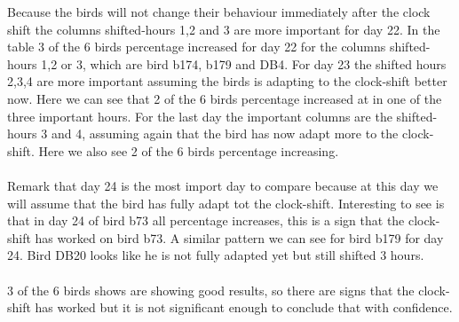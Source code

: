 \documentclass[a4paper]{article}
\begin{document}
Because the birds will not change their behaviour immediately after the clock shift the columns shifted-hours 1,2 and 3 are more important for day 22. In the table 3 of the 6 birds percentage increased for day 22 for the columns shifted-hours 1,2 or 3, which are bird b174, b179 and DB4. For day 23 the shifted hours 2,3,4 are more important assuming the birds is adapting  to the clock-shift better now. Here we can see that 2 of the 6 birds percentage increased at in one of the three important hours. For the last day the important columns are the shifted-hours 3 and 4, assuming again that the bird has now adapt more to the clock-shift. Here we also see 2 of the 6 birds percentage increasing.\\\\
Remark that day 24 is the most import day to compare because at this day we will assume that the bird has fully adapt tot the clock-shift. Interesting to see is that in day 24 of bird b73 all percentage increases, this is a sign that the clock-shift has worked on bird b73. A similar pattern we can see for bird b179 for day 24. Bird DB20 looks like he is not fully adapted yet but still shifted 3 hours.\\\\
3 of the 6 birds shows are showing good results, so there are signs that the clock-shift has worked but it is not significant enough to conclude that with confidence. 


\end{document}
